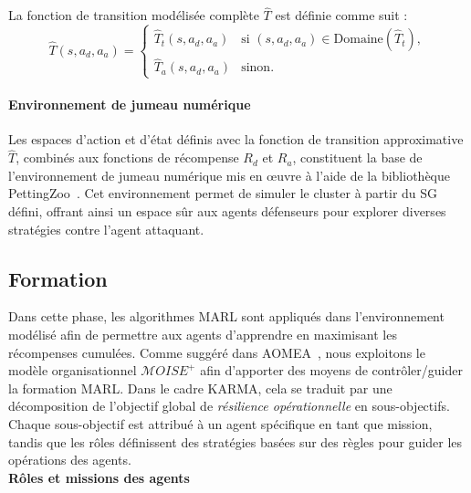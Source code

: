 La fonction de transition modélisée complète $\hat{T}$ est définie comme suit :
$$
\hat{T}(s, a_d, a_a) = 
\begin{cases} 
\hat{T}_t(s, a_d, a_a) & \text{si } (s, a_d, a_a) \in \text{Domaine}(\hat{T}_t), \\
\hat{T}_a(s, a_d, a_a) & \text{sinon}.
\end{cases}
$$

\noindent \paragraph{\textbf{Environnement de jumeau numérique}} Les espaces d'action et d'état définis avec la fonction de transition approximative $\hat{T}$, combinés aux fonctions de récompense $R_d$ et $R_a$, constituent la base de l'environnement de jumeau numérique mis en œuvre à l'aide de la bibliothèque PettingZoo~\cite{Terry2021}. Cet environnement permet de simuler le cluster à partir du SG défini, offrant ainsi un espace sûr aux agents défenseurs pour explorer diverses stratégies contre l'agent attaquant.



\subsection{Formation}
\label{sec:formation}

Dans cette phase, les algorithmes MARL sont appliqués dans l'environnement modélisé afin de permettre aux agents d'apprendre en maximisant les récompenses cumulées. Comme suggéré dans AOMEA~\cite{soule2024aomea}, nous exploitons le modèle organisationnel $\mathcal{M}OISE^+$ afin d'apporter des moyens de contrôler/guider la formation MARL. Dans le cadre KARMA, cela se traduit par une décomposition de l'objectif global de \textit{résilience opérationnelle} en sous-objectifs. Chaque sous-objectif est attribué à un agent spécifique en tant que mission, tandis que les rôles définissent des stratégies basées sur des règles pour guider les opérations des agents.\\

\noindent \textbf{Rôles et missions des agents}

\

